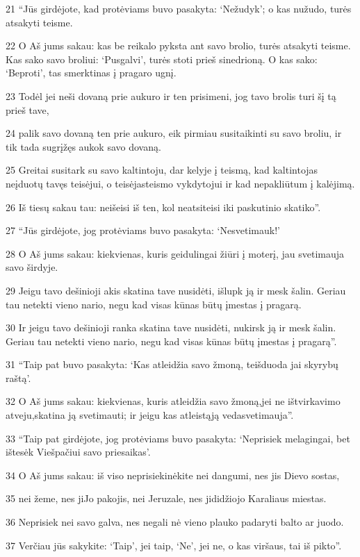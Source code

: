 \par 21 “Jūs girdėjote, kad protėviams buvo pasakyta: ‘Nežudyk’; o kas nužudo, turės atsakyti teisme. 
\par 22 O Aš jums sakau: kas be reikalo pyksta ant savo brolio, turės atsakyti teisme. Kas sako savo broliui: ‘Pusgalvi’, turės stoti prieš sinedrioną. O kas sako: ‘Beproti’, tas smerktinas į pragaro ugnį. 
\par 23 Todėl jei neši dovaną prie aukuro ir ten prisimeni, jog tavo brolis turi šį tą prieš tave, 
\par 24 palik savo dovaną ten prie aukuro, eik pirmiau susitaikinti su savo broliu, ir tik tada sugrįžęs aukok savo dovaną. 
\par 25 Greitai susitark su savo kaltintoju, dar kelyje į teismą, kad kaltintojas neįduotų tavęs teisėjui, o teisėjas­teismo vykdytojui ir kad nepakliūtum į kalėjimą. 
\par 26 Iš tiesų sakau tau: neišeisi iš ten, kol neatsiteisi iki paskutinio skatiko”. 
\par 27 “Jūs girdėjote, jog protėviams buvo pasakyta: ‘Nesvetimauk!’ 
\par 28 O Aš jums sakau: kiekvienas, kuris geidulingai žiūri į moterį, jau svetimauja savo širdyje. 
\par 29 Jeigu tavo dešinioji akis skatina tave nusidėti, išlupk ją ir mesk šalin. Geriau tau netekti vieno nario, negu kad visas kūnas būtų įmestas į pragarą. 
\par 30 Ir jeigu tavo dešinioji ranka skatina tave nusidėti, nukirsk ją ir mesk šalin. Geriau tau netekti vieno nario, negu kad visas kūnas būtų įmestas į pragarą”. 
\par 31 “Taip pat buvo pasakyta: ‘Kas atleidžia savo žmoną, teišduoda jai skyrybų raštą’. 
\par 32 O Aš jums sakau: kiekvienas, kuris atleidžia savo žmoną,­jei ne ištvirkavimo atveju,­skatina ją svetimauti; ir jeigu kas atleistąją veda­svetimauja”. 
\par 33 “Taip pat girdėjote, jog protėviams buvo pasakyta: ‘Neprisiek melagingai, bet ištesėk Viešpačiui savo priesaikas’. 
\par 34 O Aš jums sakau: iš viso neprisiekinėkite nei dangumi, nes jis­ Dievo sostas, 
\par 35 nei žeme, nes ji­Jo pakojis, nei Jeruzale, nes ji­didžiojo Karaliaus miestas. 
\par 36 Neprisiek nei savo galva, nes negali nė vieno plauko padaryti balto ar juodo. 
\par 37 Verčiau jūs sakykite: ‘Taip’, jei taip, ‘Ne’, jei ne, o kas viršaus, tai iš pikto”. 
